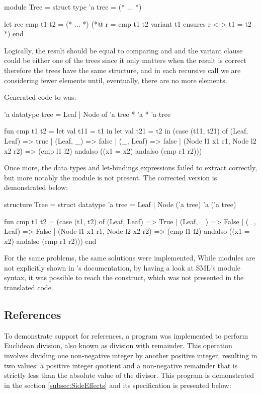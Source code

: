 \begin{gospell}
module Tree = struct
  type 'a tree = (* ... *)

  let rec cmp t1 t2 = (* ... *)
  (*@
  r = cmp t1 t2
  variant t1
  ensures r <-> t1 = t2
  *)
end
\end{gospell}

Logically, the result should be equal to comparing  and  and the variant clause could be either one of 
the trees since it only matters when the result is correct therefore the trees have the same structure, and in each recursive call we
are considering fewer elements until, eventually, there are no more elements.

Generated code to \cml was:

\begin{cakeml}
'a datatype tree = Leaf | Node of 'a tree * 'a * 'a tree

fun cmp t1 t2 = let val t11 = t1 in
  let val t21 = t2 in
  (case (t11, t21) of
    (Leaf, Leaf) => true
  | (Leaf, _) => false
  | (_, Leaf) => false
  | (Node l1 x1 r1, Node l2 x2 r2) =>
    (cmp l1 l2) andalso ((x1 = x2) andalso (cmp r1 r2)))
\end{cakeml}

Once more, the data types and let-bindings expressions failed to extract correctly, but more notably the module is not present.
The corrected version is demonstrated below:

\begin{cakeml}
structure Tree = struct
  datatype 'a tree = Leaf | Node ('a tree) 'a ('a tree)

  fun cmp t1 t2 =
  (case (t1, t2) of
    (Leaf, Leaf) => True
  | (Leaf, _) => False
  | (_, Leaf) => False
  | (Node l1 x1 r1, Node l2 x2 r2) =>
      (cmp l1 l2) andalso ((x1 = x2) andalso (cmp r1 r2)))
end
\end{cakeml}

For the same problems, the same solutions were implemented, While modules are not explicitly shown
in \cml's documentation, by having a look at SML's module syntax, it was possible to reach the 
 construct, which was not presented in the translated code.

\subsection{References}

To demonstrate support for references, a program was implemented to perform Euclidean division, also known as division with remainder. 
This operation involves dividing one non-negative integer by another positive integer, resulting in two values: a positive integer 
quotient and a non-negative remainder that is strictly less than the absolute value of the divisor. This program is demonstrated 
in the section \ref{subsec:SideEffects} and its specification is presented below:

